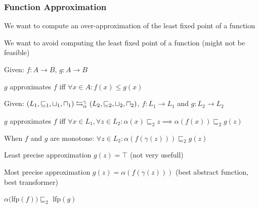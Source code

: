 \subsubsection{Function Approximation}
\enumstart
	\item We want to compute an over-approximation of the least fixed point of a function
	\item We want to avoid computing the least fixed point of a function (might not be feasible)
	\item Given: $f: A \rightarrow B$, $g: A \rightarrow B$
	\enumstart
		\item $g$ approximates $f$ iff $\forall x \in A: f(x) \le g(x)$
	\enumend
	\item Given: $(L_1, \sqsubseteq_1, \sqcup_1, \sqcap_1) \leftrightarrows^{\gamma_{}}_{\alpha_{}} (L_2, \sqsubseteq_2, \sqcup_2, \sqcap_2)$, $f: L_1 \rightarrow L_1$ and $g: L_2 \rightarrow L_2$
	\enumstart
		\item $g$ approximates $f$ iff $\forall x \in L_1, \forall z \in L_2: \alpha(x) \sqsubseteq_2 z \implies \alpha(f(x)) \sqsubseteq_2 g(z)$
		\item When $f$ and $g$ are monotone: $\forall z \in L_2: \alpha(f(\gamma(z))) \sqsubseteq_2 g(z)$
	\enumend
	\item Least precise approximation $g(z) = \top$ (not very usefull)
	\item Most precise approximation $g(z) = \alpha(f(\gamma(z)))$ (best abstract function,  best transformer)
	\item $\alpha($lfp$(f)) \sqsubseteq_2 $ lfp$(g)$
\enumend

